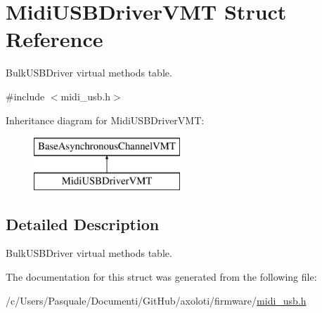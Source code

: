 \hypertarget{structMidiUSBDriverVMT}{}\section{Midi\+U\+S\+B\+Driver\+V\+MT Struct Reference}
\label{structMidiUSBDriverVMT}


{\ttfamily Bulk\+U\+S\+B\+Driver} virtual methods table.  




{\ttfamily \#include $<$midi\+\_\+usb.\+h$>$}

Inheritance diagram for Midi\+U\+S\+B\+Driver\+V\+MT\+:\begin{figure}[H]
\begin{center}
\leavevmode
\includegraphics[height=2.000000cm]{structMidiUSBDriverVMT}
\end{center}
\end{figure}


\subsection{Detailed Description}
{\ttfamily Bulk\+U\+S\+B\+Driver} virtual methods table. 

The documentation for this struct was generated from the following file\+:\begin{DoxyCompactItemize}
\item 
/c/\+Users/\+Pasquale/\+Documenti/\+Git\+Hub/axoloti/firmware/\hyperlink{midi__usb_8h}{midi\+\_\+usb.\+h}\end{DoxyCompactItemize}
